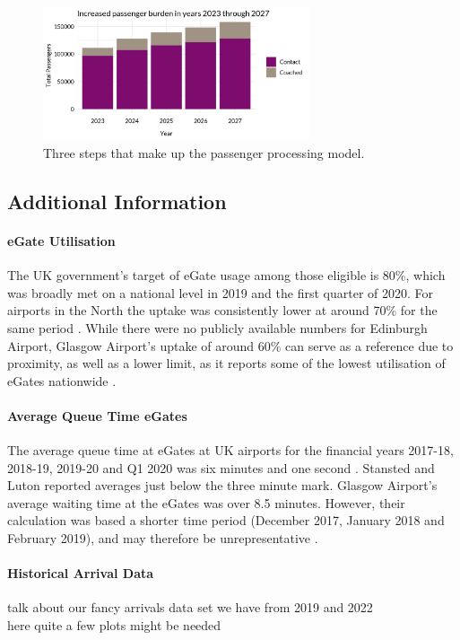 \documentclass[10pt]{article}
\begin{document}
\begin{figure}[!ht]
    \centering
    \includegraphics[width=0.7\textwidth]{figures/future_passenger_burden_fig.png}
     \caption{Three steps that make up the passenger processing model.  } \label{fig:future_passenger_burden}
\end{figure}

\subsection{Additional Information}

\paragraph{eGate Utilisation}
The UK government's target of eGate usage among those eligible is 80\%, which was broadly met on a national level in 2019 and the first quarter of 2020. For airports in the North the uptake was consistently lower at around 70\% for the same period \cite{Inspection_eGates}. While there were no publicly available numbers for Edinburgh Airport, Glasgow Airport's uptake of around 60\% can serve as a reference due to proximity, as well as a lower limit, as it reports some of the lowest utilisation of eGates nationwide \cite{Inspection_eGates}. 

\paragraph{Average Queue Time eGates}
The average queue time at eGates at UK airports for the financial years 2017-18, 2018-19, 2019-20 and Q1 2020 was six minutes and one second \cite{Inspection_eGates}. Stansted and Luton reported averages just below the three minute mark. Glasgow Airport's average waiting time at the eGates was over 8.5 minutes. However, their calculation was based a shorter time period (December 2017, January 2018 and February 2019), and may therefore be unrepresentative \cite{Inspection_eGates}.


\paragraph{Historical Arrival Data}
talk about our fancy arrivals data set we have from 2019 and 2022 \\
here quite a few plots might be needed 
\end{document}
